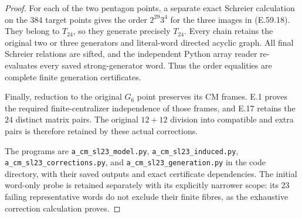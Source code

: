 \begin{proof}
For each of the two pentagon points, a separate exact Schreier
calculation on the $384$ target points gives the order
$2^{29}3^4$ for the three images in \textup{(E.59.18)}.
They belong to $T_{24}$, so they generate precisely $T_{24}$.
Every chain retains the original two or three generators and
literal-word directed acyclic graph. All final Schreier relations
are sifted, and the independent Python array reader re-evaluates
every saved strong-generator word. Thus the order equalities
are complete finite generation certificates.

Finally, reduction to the original $G_6$ point preserves its
CM frames. E.1 proves the required finite-centralizer independence
of those frames, and E.17 retains the $24$ distinct matrix pairs.
The original $12+12$ division into compatible and extra pairs is
therefore retained by these actual corrections.

The programs are \texttt{a\_cm\_sl23\_model.py},
\texttt{a\_cm\_sl23\_induced.py},
\texttt{a\_cm\_sl23\_corrections.py}, and
\texttt{a\_cm\_sl23\_generation.py} in the code directory,
with their saved outputs and exact certificate dependencies.
The initial word-only probe is retained separately with its
explicitly narrower scope: its $23$ failing representative words
do not exclude their finite fibres, as the exhaustive correction
calculation proves.
\end{proof}
